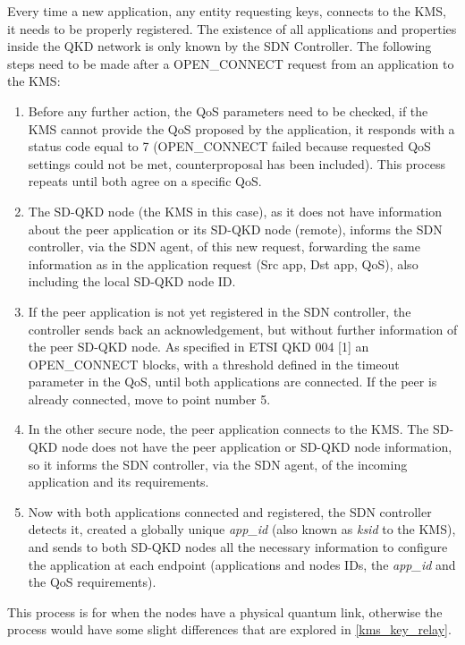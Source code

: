 \begin{refsection}
Every time a new application, any entity requesting keys, connects to the \ac{KMS}, it needs to be  properly registered. The existence of all applications and properties inside the QKD network is only known by the SDN Controller. The following steps need to be made after a OPEN\_CONNECT request from an application to the \ac{KMS}:
\begin{enumerate}
	\item Before any further action, the QoS parameters need to be checked, if the \ac{KMS} cannot provide the QoS proposed by the application, it responds with a status code equal to 7 (OPEN\_CONNECT failed because requested QoS settings could not be met, counterproposal has been included). This process repeats until both agree on a specific QoS.
	\item The SD-QKD node (the \ac{KMS} in this case), as it does not have information about the peer application or its SD-QKD node (remote), informs the SDN controller, via the SDN agent, of this new request, forwarding the same information as in the application request (Src app, Dst app, QoS), also including the local SD-QKD node ID.
	\item If the peer application is not yet registered in the SDN controller, the controller sends back an acknowledgement, but without further information of the peer SD-QKD node. As specified in ETSI QKD 004 [1] an OPEN\_CONNECT blocks, with a threshold defined in the timeout parameter in the QoS, until both applications are connected. If the peer is already connected, move to point number 5.
	\item In the other secure node, the peer application connects to the \ac{KMS}. The SD-QKD node does not have the peer application or SD-QKD node information, so it informs the SDN controller, via the SDN agent, of the incoming application and its requirements.
	\item Now with both applications connected and registered, the SDN controller detects it, created a globally unique \textit{app\_id} (also known as \textit{ksid} to the \ac{KMS}), and sends to both SD-QKD nodes all the necessary information to configure the application at each endpoint (applications and nodes IDs, the \textit{app\_id} and the QoS requirements).
\end{enumerate}

This process is for when the nodes have a physical quantum link, otherwise the process would have some slight differences that are explored in \ref{kms_key_relay}. 


\end{refsection}
